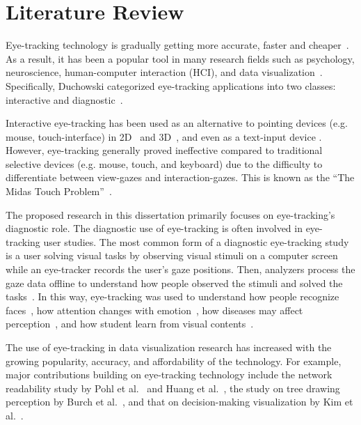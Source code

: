 \chapter{Literature Review}
Eye-tracking technology is gradually getting more accurate, faster and cheaper~\cite{Duch07}. As a result, it has been a popular tool in many research fields such as psychology, neuroscience, human-computer interaction (HCI), and data visualization~\cite{Duch02}. Specifically, Duchowski categorized eye-tracking applications into two classes: interactive and diagnostic~\cite{Duch02}.

Interactive eye-tracking has been used as an alternative to pointing devices (e.g. mouse, touch-interface) in 2D~\cite{Jacob91} and 3D~\cite{Bolt90, Tan00}, and even as a text-input device \cite{Maj02}. However, eye-tracking generally proved ineffective compared to traditional selective devices (e.g. mouse, touch, and keyboard) due to the difficulty to differentiate between view-gazes and interaction-gazes. This is known as the ``The Midas Touch Problem''~\cite{Jacob91}.

The proposed research in this dissertation primarily focuses on eye-tracking's diagnostic role. The diagnostic use of eye-tracking is often involved in eye-tracking user studies. The most common form of a diagnostic eye-tracking study is a user solving visual tasks by observing visual stimuli on a computer screen while an eye-tracker records the user's gaze positions. Then, analyzers process the gaze data offline to understand how people observed the stimuli and solved the tasks~\cite{Duch07}. In this way, eye-tracking was used to understand how people recognize faces~\cite{Guo14, Sha14}, how attention changes with emotion~\cite{Ver13}, how diseases may affect perception~\cite{Kim14}, and how student learn from visual contents~\cite{Zaw15, May10, vGo10, Con13}.   

The use of eye-tracking in data visualization research has increased with the growing popularity, accuracy, and affordability of the technology. For example, major contributions building on eye-tracking technology include the network readability study by Pohl et al.~\cite{Poh09} and Huang et al.~\cite{Hua08, Hua05}, the study on tree drawing perception by Burch et al.~\cite{Bur11, Bur13}, and that on decision-making visualization by Kim et al.~\cite{Kim12}. 

